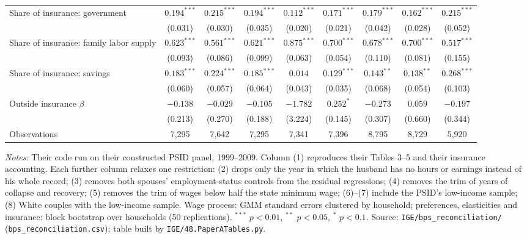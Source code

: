 \begin{table}[!htbp]
{\begin{tabular}{lcccccccc}
Share of insurance: government & $0.194^{***}$ & $0.215^{***}$ & $0.194^{***}$ & $0.112^{***}$ & $0.171^{***}$ & $0.179^{***}$ & $0.162^{***}$ & $0.215^{***}$ \\
 & (0.031) & (0.030) & (0.035) & (0.020) & (0.021) & (0.042) & (0.028) & (0.052) \\
Share of insurance: family labor supply & $0.623^{***}$ & $0.561^{***}$ & $0.621^{***}$ & $0.875^{***}$ & $0.700^{***}$ & $0.678^{***}$ & $0.700^{***}$ & $0.517^{***}$ \\
 & (0.093) & (0.086) & (0.099) & (0.063) & (0.054) & (0.110) & (0.081) & (0.155) \\
Share of insurance: savings & $0.183^{***}$ & $0.224^{***}$ & $0.185^{***}$ & $0.014$ & $0.129^{***}$ & $0.143^{**}$ & $0.138^{**}$ & $0.268^{***}$ \\
 & (0.060) & (0.057) & (0.064) & (0.043) & (0.035) & (0.068) & (0.054) & (0.103) \\
Outside insurance $\beta$ & $-0.138$ & $-0.029$ & $-0.105$ & $-1.782$ & $0.252^{*}$ & $-0.273$ & $0.059$ & $-0.197$ \\
 & (0.213) & (0.270) & (0.188) & (3.224) & (0.145) & (0.307) & (0.660) & (0.344) \\
Observations & 7,295 & 7,642 & 7,295 & 7,341 & 7,396 & 8,795 & 8,729 & 5,920 \\
\bottomrule
\end{tabular}}
\par\smallskip
\begin{minipage}{\textwidth}\footnotesize \textit{Notes:} Their code run on their constructed PSID panel, 1999--2009. Column (1) reproduces their Tables 3--5 and their insurance accounting. Each further column relaxes one restriction: (2) drops only the year in which the husband has no hours or earnings instead of his whole record; (3) removes both spouses' employment-status controls from the residual regressions; (4) removes the trim of years of collapse and recovery; (5) removes the trim of wages below half the state minimum wage; (6)--(7) include the PSID's low-income sample; (8) White couples with the low-income sample. Wage process: GMM standard errors clustered by household; preferences, elasticities and insurance: block bootstrap over households (50 replications). $^{***}$ $p<0.01$, $^{**}$ $p<0.05$, $^{*}$ $p<0.1$. Source: \texttt{IGE/bps\_reconciliation/} (\texttt{bps\_reconciliation.csv}); table built by \texttt{IGE/48.PaperATables.py}.\end{minipage}
\end{table}
